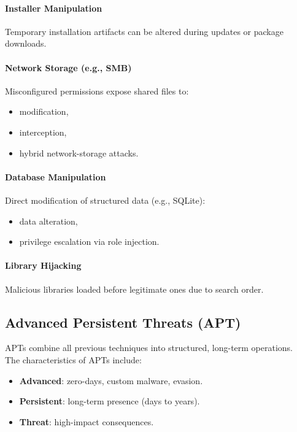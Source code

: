 \paragraph{Installer Manipulation}
Temporary installation artifacts can be altered during updates or package downloads.

\paragraph{Network Storage (e.g., SMB)}
Misconfigured permissions expose shared files to:
\begin{itemize}
    \item modification,
    \item interception,
    \item hybrid network-storage attacks.
\end{itemize}

\paragraph{Database Manipulation}
Direct modification of structured data (e.g., SQLite):
\begin{itemize}
    \item data alteration,
    \item privilege escalation via role injection.
\end{itemize}

\paragraph{Library Hijacking}
Malicious libraries loaded before legitimate ones due to search order.



\subsection{Advanced Persistent Threats (APT)}

APTs combine all previous techniques into structured, long-term operations.\\
The characteristics of APTs include:

\begin{itemize}
    \item \textbf{Advanced}: zero-days, custom malware, evasion.
    \item \textbf{Persistent}: long-term presence (days to years).
    \item \textbf{Threat}: high-impact consequences.
\end{itemize}

